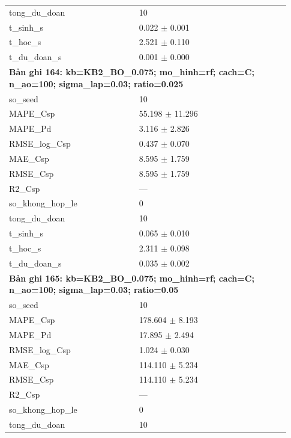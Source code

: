 \begin{longtable}{p{0.43\linewidth}p{0.50\linewidth}}
tong\_\allowbreak du\_\allowbreak doan & 10 \\
t\_\allowbreak sinh\_\allowbreak s & 0.022 $\pm$ 0.001 \\
t\_\allowbreak hoc\_\allowbreak s & 2.521 $\pm$ 0.110 \\
t\_\allowbreak du\_\allowbreak doan\_\allowbreak s & 0.001 $\pm$ 0.000 \\
\midrule
\multicolumn{2}{p{0.95\linewidth}}{\textbf{Bản ghi 164: kb=KB2\_BO\_0.075; mo\_hinh=rf; cach=C; n\_ao=100; sigma\_lap=0.03; ratio=0.025}} \\
so\_\allowbreak seed & 10 \\
MAPE\_\allowbreak Csp & 55.198 $\pm$ 11.296 \\
MAPE\_\allowbreak Pd & 3.116 $\pm$ 2.826 \\
RMSE\_\allowbreak log\_\allowbreak Csp & 0.437 $\pm$ 0.070 \\
MAE\_\allowbreak Csp & 8.595 $\pm$ 1.759 \\
RMSE\_\allowbreak Csp & 8.595 $\pm$ 1.759 \\
R2\_\allowbreak Csp & — \\
so\_\allowbreak khong\_\allowbreak hop\_\allowbreak le & 0 \\
tong\_\allowbreak du\_\allowbreak doan & 10 \\
t\_\allowbreak sinh\_\allowbreak s & 0.065 $\pm$ 0.010 \\
t\_\allowbreak hoc\_\allowbreak s & 2.311 $\pm$ 0.098 \\
t\_\allowbreak du\_\allowbreak doan\_\allowbreak s & 0.035 $\pm$ 0.002 \\
\midrule
\multicolumn{2}{p{0.95\linewidth}}{\textbf{Bản ghi 165: kb=KB2\_BO\_0.075; mo\_hinh=rf; cach=C; n\_ao=100; sigma\_lap=0.03; ratio=0.05}} \\
so\_\allowbreak seed & 10 \\
MAPE\_\allowbreak Csp & 178.604 $\pm$ 8.193 \\
MAPE\_\allowbreak Pd & 17.895 $\pm$ 2.494 \\
RMSE\_\allowbreak log\_\allowbreak Csp & 1.024 $\pm$ 0.030 \\
MAE\_\allowbreak Csp & 114.110 $\pm$ 5.234 \\
RMSE\_\allowbreak Csp & 114.110 $\pm$ 5.234 \\
R2\_\allowbreak Csp & — \\
so\_\allowbreak khong\_\allowbreak hop\_\allowbreak le & 0 \\
tong\_\allowbreak du\_\allowbreak doan & 10 \\

\end{longtable}
